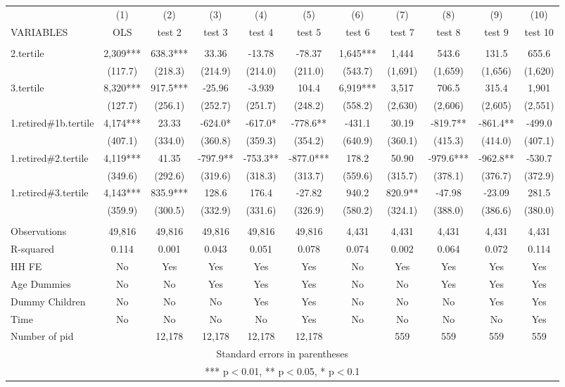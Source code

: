 \begin{tabular}{lcccccccccc} \hline
 & (1) & (2) & (3) & (4) & (5) & (6) & (7) & (8) & (9) & (10) \\
VARIABLES & OLS & test 2 & test 3 & test 4 & test 5 & test 6 & test 7 & test 8 & test 9 & test 10 \\ \hline
 &  &  &  &  &  &  &  &  &  &  \\
2.tertile & 2,309*** & 638.3*** & 33.36 & -13.78 & -78.37 & 1,645*** & 1,444 & 543.6 & 131.5 & 655.6 \\
 & (117.7) & (218.3) & (214.9) & (214.0) & (211.0) & (543.7) & (1,691) & (1,659) & (1,656) & (1,620) \\
3.tertile & 8,320*** & 917.5*** & -25.96 & -3.939 & 104.4 & 6,919*** & 3,517 & 706.5 & 315.4 & 1,901 \\
 & (127.7) & (256.1) & (252.7) & (251.7) & (248.2) & (558.2) & (2,630) & (2,606) & (2,605) & (2,551) \\
1.retired\#1b.tertile & 4,174*** & 23.33 & -624.0* & -617.0* & -778.6** & -431.1 & 30.19 & -819.7** & -861.4** & -499.0 \\
 & (407.1) & (334.0) & (360.8) & (359.3) & (354.2) & (640.9) & (360.1) & (415.3) & (414.0) & (407.1) \\
1.retired\#2.tertile & 4,119*** & 41.35 & -797.9** & -753.3** & -877.0*** & 178.2 & 50.90 & -979.6*** & -962.8** & -530.7 \\
 & (349.6) & (292.6) & (319.6) & (318.3) & (313.7) & (559.6) & (315.7) & (378.1) & (376.7) & (372.9) \\
1.retired\#3.tertile & 4,143*** & 835.9*** & 128.6 & 176.4 & -27.82 & 940.2 & 820.9** & -47.98 & -23.09 & 281.5 \\
 & (359.9) & (300.5) & (332.9) & (331.6) & (326.9) & (580.2) & (324.1) & (388.0) & (386.6) & (380.0) \\
 &  &  &  &  &  &  &  &  &  &  \\
Observations & 49,816 & 49,816 & 49,816 & 49,816 & 49,816 & 4,431 & 4,431 & 4,431 & 4,431 & 4,431 \\
R-squared & 0.114 & 0.001 & 0.043 & 0.051 & 0.078 & 0.074 & 0.002 & 0.064 & 0.072 & 0.114 \\
HH FE & No & Yes & Yes & Yes & Yes & No & Yes & Yes & Yes & Yes \\
Age Dummies & No & No & Yes & Yes & Yes & No & No & Yes & Yes & Yes \\
Dummy Children & No & No & No & Yes & Yes & No & No & No & Yes & Yes \\
Time & No & No & No & No & Yes & No & No & No & No & Yes \\
 Number of pid &  & 12,178 & 12,178 & 12,178 & 12,178 &  & 559 & 559 & 559 & 559 \\ \hline
\multicolumn{11}{c}{ Standard errors in parentheses} \\
\multicolumn{11}{c}{ *** p$<$0.01, ** p$<$0.05, * p$<$0.1} \\
\end{tabular}
